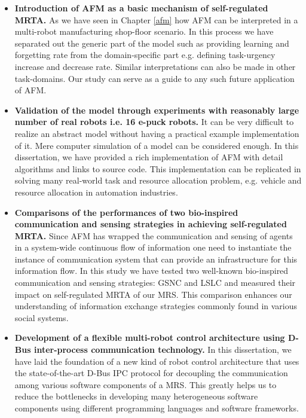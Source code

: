 \begin{itemize}
\item \textbf{Introduction of AFM as a basic mechanism of self-regulated MRTA.} As we have seen in Chapter \ref{afm} how AFM can be  interpreted in a multi-robot manufacturing shop-floor scenario.  In this process we have separated out the generic part of the model such as providing learning and forgetting rate from the domain-specific part e.g. defining task-urgency increase and decrease rate. Similar interpretations can also be made in other task-domains. Our study can serve as a guide to any such future application of AFM.
\item \textbf{Validation of the model through experiments with reasonably large number of real robots i.e. 16 e-puck robots. }It can be very difficult to realize an abstract model without having a practical example implementation of it. Mere computer simulation of a model can be considered enough. In this dissertation, we have provided a rich implementation of AFM with detail algorithms and links to source code. This implementation can be replicated in solving many real-world task and resource allocation problem, e.g. vehicle and resource allocation in automation industries.
\item \textbf{Comparisons of the performances of two bio-inspired communication and sensing strategies in achieving self-regulated MRTA.} Since AFM has wrapped the communication and sensing of agents  in a system-wide continuous flow of information one need to instantiate the instance of communication system that can provide an infrastructure for this information flow. In this study we have tested two well-known bio-inspired  communication and sensing strategies: GSNC and LSLC and measured their impact on self-regulated MRTA of our MRS. This comparison enhances our understanding of information exchange strategies commonly found in various social systems.
\item \textbf{Development of a flexible multi-robot control architecture using D-Bus inter-process communication technology.} In this dissertation, we have laid the foundation of a new kind of robot control architecture that uses the state-of-the-art D-Bus IPC protocol for decoupling the communication among various software components of a MRS. This greatly helps us to reduce the bottlenecks in developing many heterogeneous software components using different programming languages and software frameworks.

\end{itemize}
